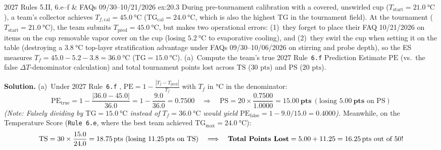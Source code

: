 \begin{workedexample}{2027 Rules 5.II, 6.e--f \& FAQs 09/30--10/21/2026 }{ex:20.3}
During pre-tournament calibration with a covered, unswirled cup ($T_{\mathrm{start}} = \SI{21.0}{\celsius}$), a team's collector achieves $T_{f,\mathrm{cal}} = \SI{45.0}{\celsius}$ ($\mathrm{TG}_{\mathrm{cal}} = \SI{24.0}{\celsius}$, which is also the highest $\mathrm{TG}$ in the tournament field). At the tournament ($T_{\mathrm{start}} = \SI{21.0}{\celsius}$), the team submits $T_{\mathrm{pred}} = \SI{45.0}{\celsius}$, but makes two operational errors: (1)~they forget to place their FAQ 10/21/2026 on items on the cup removable vapor cover on the cup (losing $\SI{5.2}{\celsius}$ to evaporative cooling), and (2)~they swirl the cup when setting it on the table (destroying a $\SI{3.8}{\celsius}$ top-layer stratification advantage under FAQs 09/30--10/06/2026 on stirring and probe depth), so the ES measures $T_f = 45.0 - 5.2 - 3.8 = \SI{36.0}{\celsius}$ ($\mathrm{TG} = \SI{15.0}{\celsius}$). (a)~Compute the team's true 2027 Rule~\texttt{6.f} Prediction Estimate $\mathrm{PE}$ (vs.\ the false $\Delta T$-denominator calculation) and total tournament points lost across $\mathrm{TS}$ ($30\text{ pts}$) and $\mathrm{PS}$ ($20\text{ pts}$).
\par\smallskip\noindent
\textbf{Solution.}
(a)~Under 2027 Rule~\texttt{6.f} , $\mathrm{PE} = 1 - \frac{|T_f - T_{\mathrm{pred}}|}{T_f}$ with $T_f$ in $\si{\celsius}$ in the denominator:
$$\mathrm{PE}_{\mathrm{true}} = 1 - \frac{|36.0 - 45.0|}{36.0} = 1 - \frac{9.0}{36.0} = \mathbf{0.7500} \quad\Longrightarrow\quad \mathrm{PS} = 20 \times \frac{0.7500}{1.0000} = \mathbf{\SI{15.00}{\text{pts}}}\ (\text{losing }\mathbf{\SI{5.00}{\text{pts}}}\text{ on }\mathrm{PS})$$
\emph{(Note: Falsely dividing by $\mathrm{TG} = \SI{15.0}{\celsius}$ instead of $T_f = \SI{36.0}{\celsius}$ would yield $\mathrm{PE}_{\mathrm{false}} = 1 - 9.0/15.0 = 0.4000$).} Meanwhile, on the Temperature Score (\texttt{Rule 6.e}, where the best team achieved $\mathrm{TG}_{\max} = \SI{24.0}{\celsius}$):
$$\mathrm{TS} = 30 \times \frac{15.0}{24.0} = \mathbf{\SI{18.75}{\text{pts}}}\ (\text{losing }\mathbf{\SI{11.25}{\text{pts}}}\text{ on }\mathrm{TS}) \quad\Longrightarrow\quad \text{\textbf{Total Points Lost}} = 5.00 + 11.25 = \mathbf{\SI{16.25}{\text{pts out of 50}}}\text{!}$$
\end{workedexample}

